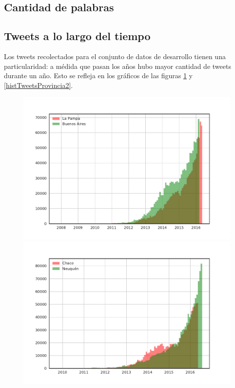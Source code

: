 \subsection{Cantidad de palabras}
\subsection{Tweets a lo largo del tiempo}
Los tweets recolectados para el conjunto de datos de desarrollo tienen una particularidad: a médida que pasan los años 
hubo mayor cantidad de tweets durante un año. Esto se refleja en los gráficos de las figuras \ref{fig:histTweetsProvincia1} y \ref{histTweetsProvincia2}.

\begin{figure}[!ht]\centering
   \begin{minipage}{0.49\textwidth}
     \includegraphics[width=\linewidth]{./images/train/sinFiltro/histTweetsProvincia1_sinFiltro.pdf}
     \caption{}
     \label{fig:histTweetsProvincia1}
   \end{minipage}
   \begin {minipage}{0.49\textwidth}
     \includegraphics[width=\linewidth]{./images/train/sinFiltro/histTweetsProvincia2_sinFiltro.pdf}

\end{minipage}
\end{figure}
